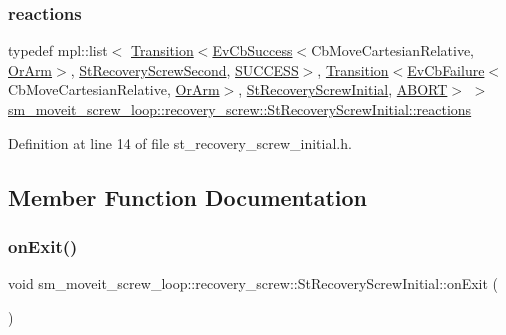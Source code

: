 \subsubsection{\texorpdfstring{reactions}{reactions}}
{\footnotesize\ttfamily typedef mpl\+::list$<$ \hyperlink{classsmacc_1_1Transition}{Transition}$<$\hyperlink{structsmacc_1_1EvCbSuccess}{Ev\+Cb\+Success}$<$Cb\+Move\+Cartesian\+Relative, \hyperlink{classsm__moveit__screw__loop_1_1OrArm}{Or\+Arm}$>$, \hyperlink{structsm__moveit__screw__loop_1_1recovery__screw_1_1StRecoveryScrewSecond}{St\+Recovery\+Screw\+Second}, \hyperlink{structsmacc_1_1default__transition__tags_1_1SUCCESS}{S\+U\+C\+C\+E\+SS}$>$, \hyperlink{classsmacc_1_1Transition}{Transition}$<$\hyperlink{structsmacc_1_1EvCbFailure}{Ev\+Cb\+Failure}$<$Cb\+Move\+Cartesian\+Relative, \hyperlink{classsm__moveit__screw__loop_1_1OrArm}{Or\+Arm}$>$, \hyperlink{structsm__moveit__screw__loop_1_1recovery__screw_1_1StRecoveryScrewInitial}{St\+Recovery\+Screw\+Initial}, \hyperlink{structsmacc_1_1default__transition__tags_1_1ABORT}{A\+B\+O\+RT}$>$ $>$ \hyperlink{structsm__moveit__screw__loop_1_1recovery__screw_1_1StRecoveryScrewInitial_acb420575351e75972d5c36331e7e0828}{sm\+\_\+moveit\+\_\+screw\+\_\+loop\+::recovery\+\_\+screw\+::\+St\+Recovery\+Screw\+Initial\+::reactions}}



Definition at line 14 of file st\+\_\+recovery\+\_\+screw\+\_\+initial.\+h.



\subsection{Member Function Documentation}
\mbox{\label{structsm__moveit__screw__loop_1_1recovery__screw_1_1StRecoveryScrewInitial_a79c8cccc82f4b2685155b48799c5a035}} 
\subsubsection{\texorpdfstring{on\+Exit()}{onExit()}}
{\footnotesize\ttfamily void sm\+\_\+moveit\+\_\+screw\+\_\+loop\+::recovery\+\_\+screw\+::\+St\+Recovery\+Screw\+Initial\+::on\+Exit (\begin{DoxyParamCaption}{ }\end{DoxyParamCaption})\hspace{0.3cm}{\ttfamily [inline]}}



